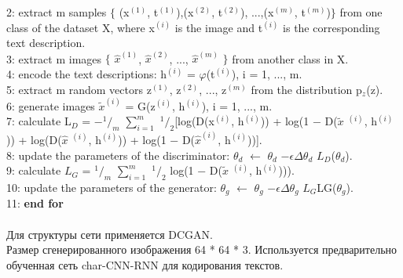 \documentclass{article}
\begin{document}
    2: \indent extract m samples $\{$ (x$^(1)$, t$^{(1)}$),(x$^{(2)}$, t$^{(2)}$), ...,(x$^{(m)}$, t$^{(m)}$)$\}$ from one class of the dataset X, where x$^{(i)}$ is the image and t$^{(i)}$ is the corresponding text description.\\
    3: \indent extract m images $\{$ $\hat{x}^{(1)}$, $\hat{x}^{(2)}$, ..., $\hat{x}^{(m)}$ $\}$ from another class in X.\\
    4: \indent encode the text descriptions: h$^{(i)}$ = $\varphi$(t$^{(i)}$), i = 1, ..., m.\\
    5: \indent extract m random vectors {z$^{(1)}$, z$^{(2)}$, ..., z$^{(m)}$} from the distribution p$_z$(z).\\
    6: \indent generate images $\widetilde{x}^{(i)}$ = G(z$^{(i)}$, h$^{(i)}$), i = 1, ..., m.\\
    7: \indent calculate L$_D$ = −$^1/_m$ $\sum_{i=1}^{m}$ $^1/_2$[log(D(x$^{(i)}$, h$^{(i)}$)) + log(1 − D($\widetilde{x}$ $^{(i)}$, h$^{(i)}$)) + log(D($\hat{x}$ $^{(i)}$, h$^{(i)}$)) + log(1 − D($\hat{x}^{(i)}$, h$^{(i)}$))].\\
    8: \indent update the parameters of the discriminator: $\theta _{d}$ $\leftarrow$ $\theta _{d}$ $- \epsilon \Delta$$\theta _{d}$ $L_{D}$($\theta _{d}$).\\
    9: \indent calculate $L_{G}$ = $^1/_m$ $\sum_{i=1}^{m}$ $^1/_2$ log(1 − D($\widetilde{x}$ $^{(i)}$, h$^{(i)}$))).\\
    10: \indent update the parameters of the generator: $\theta _{g}$ $\leftarrow$ $\theta _{g}$ $ - \epsilon \Delta$$\theta _{g}$ $L_{G}$LG($\theta _{g}$).\\
    11: \textbf {end for}
    \\ \\ 
    Для структуры сети применяется DCGAN. \\
    Размер сгенерированного изображения 64 * 64 * 3. Используется предварительно обученная сеть char-CNN-RNN для кодирования текстов.
    
\end{document}
